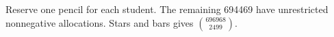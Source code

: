 Reserve one pencil for each student. The remaining 694469 have unrestricted nonnegative allocations. Stars and bars gives $\boxed{\binom{696968}{2499}}$.
